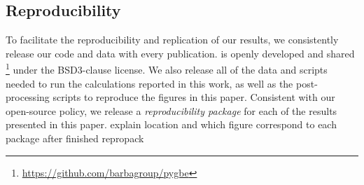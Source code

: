 \subsection{Reproducibility} \label{sec:repro}

To facilitate the reproducibility and replication of our results, 
we consistently release our code and data with every publication. \pygbe is openly developed and 
shared \footnote{\url{https://github.com/barbagroup/pygbe}} under the BSD3-clause  license. 
We also release all of the data and scripts needed to run the calculations reported in this work, 
as well as the post-processing scripts to reproduce the figures in this paper. 
Consistent with our open-source policy, we release a \textit{reproducibility package} for each of the results presented in this paper. 
{\color{red} explain location and which figure correspond to each package after finished repropack}

